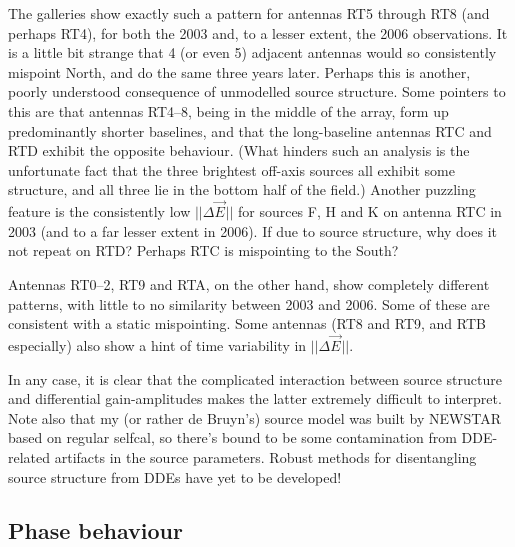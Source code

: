 \documentclass[]{aa}
\newcommand{\jones}[2]{\vec {#1}_{#2}}
\begin{document}
The galleries show exactly such a pattern for antennas RT5 through RT8 (and perhaps RT4), for both the 2003 and, to a lesser extent, the 2006 observations. It is a little bit strange that 4 (or even 5) adjacent antennas would so consistently mispoint North, and do the same three years later. Perhaps this is another, poorly understood consequence of unmodelled source structure. Some pointers to this are that antennas RT4--8, being in the middle of the array, form up predominantly shorter baselines, and that the long-baseline antennas RTC and RTD exhibit the opposite behaviour. (What hinders such an analysis is the unfortunate fact that the three brightest off-axis sources all exhibit some structure, and all three lie in the bottom half of the field.) Another puzzling feature is the consistently low $||\Delta\jones{E}{}||$ for sources F, H and K on antenna RTC in 2003 (and to a far lesser extent in 2006). If due to source structure, why does it not repeat on RTD? Perhaps RTC is mispointing to the South?

Antennas RT0--2, RT9 and RTA, on the other hand, show completely different patterns, with little to no similarity between 2003 and 2006. Some of these are consistent with a static mispointing. Some antennas (RT8 and RT9, and RTB especially) also show a hint of time variability in $||\Delta\jones{E}{}||$.

In any case, it is clear that the complicated interaction between source structure and differential gain-amplitudes makes the latter extremely difficult to interpret. Note also that my (or rather de Bruyn's) source model was built by NEWSTAR based on regular selfcal, so there's bound to be some contamination from DDE-related artifacts in the source parameters. Robust methods for disentangling source structure from DDEs have yet to be developed!

\subsection{Phase behaviour}

\end{document}
